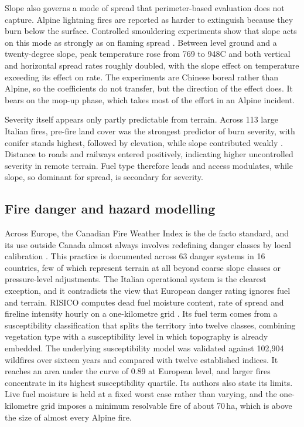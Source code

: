 \documentclass[11pt,a4paper]{article}
\begin{document}
Slope also governs a mode of spread that perimeter-based evaluation does not capture. Alpine lightning fires are reported as harder to extinguish because they burn below the surface. Controlled smouldering experiments show that slope acts on this mode as strongly as on flaming spread \citep{shan_influence_2024}. Between level ground and a twenty-degree slope, peak temperature rose from 769 to 948\degree{}C and both vertical and horizontal spread rates roughly doubled, with the slope effect on temperature exceeding its effect on rate. The experiments are Chinese boreal rather than Alpine, so the coefficients do not transfer, but the direction of the effect does. It bears on the mop-up phase, which takes most of the effort in an Alpine incident.

Severity itself appears only partly predictable from terrain. Across 113 large Italian fires, pre-fire land cover was the strongest predictor of burn severity, with conifer stands highest, followed by elevation, while slope contributed weakly \citep{malandra_burn_2022}. Distance to roads and railways entered positively, indicating higher uncontrolled severity in remote terrain. Fuel type therefore leads and access modulates, while slope, so dominant for spread, is secondary for severity.

\subsection{Fire danger and hazard modelling}

Across Europe, the Canadian Fire Weather Index is the de facto standard, and its use outside Canada almost always involves redefining danger classes by local calibration \citep{zacharakis_environmental_2023}. This practice is documented across 63 danger systems in 16 countries, few of which represent terrain at all beyond coarse slope classes or pressure-level adjustments. The Italian operational system is the clearest exception, and it contradicts the view that European danger rating ignores fuel and terrain. RISICO computes dead fuel moisture content, rate of spread and fireline intensity hourly on a one-kilometre grid \citep{perello_fuelaware_2025}. Its fuel term comes from a susceptibility classification that splits the territory into twelve classes, combining vegetation type with a susceptibility level in which topography is already embedded. The underlying susceptibility model was validated against 102{,}904 wildfires over sixteen years and compared with twelve established indices. It reaches an area under the curve of 0.89 at European level, and larger fires concentrate in its highest susceptibility quartile. Its authors also state its limits. Live fuel moisture is held at a fixed worst case rather than varying, and the one-kilometre grid imposes a minimum resolvable fire of about 70\,ha, which is above the size of almost every Alpine fire.
\end{document}
